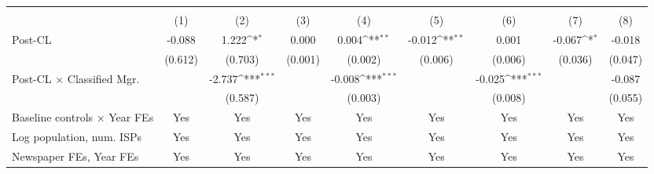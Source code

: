 {
\def\sym#1{\ifmmode^{#1}\else\(^{#1}\)\fi}
\begin{tabular}{l*{8}{c}}
\toprule
                    &&&&\\\cmidrule(lr){2-3}\cmidrule(lr){4-5}\cmidrule(lr){6-7}\cmidrule(lr){8-9}
                    &         &         &         &         &         &         &         &         \\
\midrule
Post-CL             &      -0.088         &       1.222\sym{*}  &       0.000         &       0.004\sym{**} &      -0.012\sym{**} &       0.001         &      -0.067\sym{*}  &      -0.018         \\
                    &     (0.612)         &     (0.703)         &     (0.001)         &     (0.002)         &     (0.006)         &     (0.006)         &     (0.036)         &     (0.047)         \\
\addlinespace
Post-CL $\times$ Classified Mgr.&                     &      -2.737\sym{***}&                     &      -0.008\sym{***}&                     &      -0.025\sym{***}&                     &      -0.087         \\
                    &                     &     (0.587)         &                     &     (0.003)         &                     &     (0.008)         &                     &     (0.055)         \\
\addlinespace
Baseline controls $\times$ Year FEs &         Yes         &         Yes         &         Yes         &         Yes         &         Yes         &         Yes         &         Yes         &         Yes         \\
\addlinespace
Log population, num. ISPs &         Yes         &         Yes         &         Yes         &         Yes         &         Yes         &         Yes         &         Yes         &         Yes         \\
\addlinespace
Newspaper FEs, Year FEs &         Yes         &         Yes         &         Yes         &         Yes         &         Yes         &         Yes         &         Yes         &         Yes         \\

\end{tabular}}
